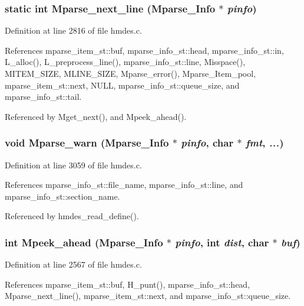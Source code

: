 \subsubsection{\setlength{\rightskip}{0pt plus 5cm}static int Mparse\_\-next\_\-line (\bf{Mparse\_\-Info} $\ast$ {\em pinfo})\hspace{0.3cm}{\tt  [static]}}\label{hmdes_8c_56f33ce1f0bd64ecc6125805c1d6b11b}




Definition at line 2816 of file hmdes.c.

References mparse\_\-item\_\-st::buf, mparse\_\-info\_\-st::head, mparse\_\-info\_\-st::in, L\_\-alloc(), L\_\-preprocess\_\-line(), mparse\_\-info\_\-st::line, Misspace(), MITEM\_\-SIZE, MLINE\_\-SIZE, Mparse\_\-error(), Mparse\_\-Item\_\-pool, mparse\_\-item\_\-st::next, NULL, mparse\_\-info\_\-st::queue\_\-size, and mparse\_\-info\_\-st::tail.

Referenced by Mget\_\-next(), and Mpeek\_\-ahead().
\subsubsection{\setlength{\rightskip}{0pt plus 5cm}void Mparse\_\-warn (\bf{Mparse\_\-Info} $\ast$ {\em pinfo}, char $\ast$ {\em fmt},  {\em ...})}\label{hmdes_8c_d75289a172681118dcf3d2dc27779d8f}




Definition at line 3059 of file hmdes.c.

References mparse\_\-info\_\-st::file\_\-name, mparse\_\-info\_\-st::line, and mparse\_\-info\_\-st::section\_\-name.

Referenced by hmdes\_\-read\_\-define().
\subsubsection{\setlength{\rightskip}{0pt plus 5cm}int Mpeek\_\-ahead (\bf{Mparse\_\-Info} $\ast$ {\em pinfo}, int {\em dist}, char $\ast$ {\em buf})}\label{hmdes_8c_d1b202220f173d1a1cf133ed53e7de09}




Definition at line 2567 of file hmdes.c.

References mparse\_\-item\_\-st::buf, H\_\-punt(), mparse\_\-info\_\-st::head, Mparse\_\-next\_\-line(), mparse\_\-item\_\-st::next, and mparse\_\-info\_\-st::queue\_\-size.

